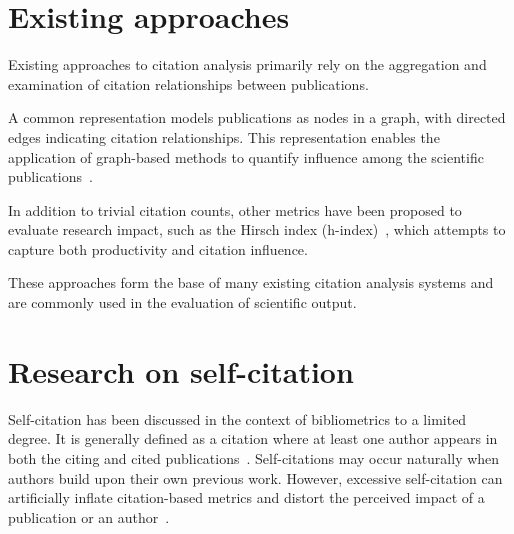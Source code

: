 \section{Existing approaches} \label{sec:existing-approaches}

Existing approaches to citation analysis primarily rely on the aggregation and examination of citation relationships between publications.

A common representation models publications as nodes in a graph, with directed edges indicating citation relationships.
This representation enables the application of graph-based methods to quantify influence among the scientific publications~\cite{Boyack2005, Chronis2021, Chronis2020}.


In addition to trivial citation counts, other metrics have been proposed to evaluate research impact, such as the \textsf{Hirsch index} (\textsf{h-index})~\cite{Hirsch2005}, which attempts to capture both productivity and citation influence.

These approaches form the base of many existing citation analysis systems and are commonly used in the evaluation of scientific output.

\section{Research on self-citation} \label{sec:research-on-self-citation}

Self-citation has been discussed in the context of bibliometrics to a limited degree.
It is generally defined as a citation where at least one author appears in both the citing and cited publications~\cite{Glnzel2003BIBLIOMETRICSAA, Fowler2007, R2008ImpactReinforcing}.
Self-citations may occur naturally when authors build upon their own previous work.
However, excessive self-citation can artificially inflate citation-based metrics and distort the perceived impact of a publication or an author~\cite{Fowler2007, R2008ImpactReinforcing}.

